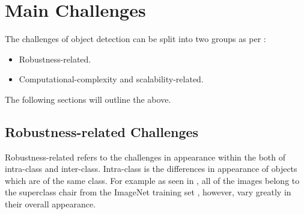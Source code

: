 \section{Main Challenges}
The challenges of object detection can be split into two groups as per \cite{zhang}:

\begin{itemize}
	\item Robustness-related.
	\item Computational-complexity and scalability-related.
\end{itemize}

The following sections will outline the above.

\subsection{Robustness-related Challenges}

Robustness-related refers to the challenges in appearance within the both of intra-class and inter-class. Intra-class is the differences in appearance of objects which are of the same class. For example as seen in , all of the images belong to the superclass chair from the ImageNet training set \cite{imagenet}, however, vary greatly in their overall appearance. 


